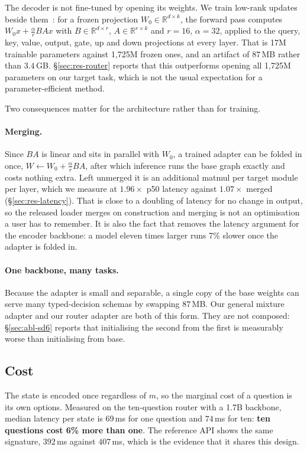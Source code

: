 The decoder is not fine-tuned by opening its weights. We train low-rank
updates beside them~\cite{lora}: for a frozen projection $W_0 \in
\mathbb{R}^{d\times k}$, the forward pass computes $W_0 x + \tfrac{\alpha}{r}
BAx$ with $B \in \mathbb{R}^{d\times r}$, $A \in \mathbb{R}^{r\times k}$
and $r = 16$, $\alpha = 32$, applied to the query, key, value, output,
gate, up and down projections at every layer. That is 17M trainable
parameters against 1{,}725M frozen ones, and an artifact of $87$\,MB
rather than $3.4$\,GB. \S\ref{sec:res-router} reports that this
outperforms opening all 1{,}725M parameters on our target task, which is
not the usual expectation for a parameter-efficient method.

Two consequences matter for the architecture rather than for training.

\paragraph{Merging.} Since $BA$ is linear and sits in parallel with
$W_0$, a trained adapter can be folded in once, $W \gets W_0 +
\tfrac{\alpha}{r} BA$, after which inference runs the base graph exactly
and costs nothing extra. Left unmerged it is an additional matmul per
target module per layer, which we measure at $1.96\times$ p50 latency
against $1.07\times$ merged (\S\ref{sec:res-latency}). That is close to a
doubling of latency for no change in output, so the released loader
merges on construction and merging is not an optimisation a user has to
remember. It is also the fact that removes the latency argument for the
encoder backbone: a model eleven times larger runs 7\% slower once the
adapter is folded in.

\paragraph{One backbone, many tasks.} Because the adapter is small and
separable, a single copy of the base weights can serve many typed-decision
schemas by swapping $87$\,MB. Our general mixture adapter and our router
adapter are both of this form. They are not composed: \S\ref{sec:abl-sd6}
reports that initialising the second from the first is measurably worse
than initialising from base.

\subsection{Cost}

The state is encoded once regardless of $m$, so the marginal cost of a
question is its own options. Measured on the ten-question router with a
1.7B backbone, median latency per state is $69$\,ms for one question and
$74$\,ms for ten: \textbf{ten questions cost 6\% more than one}. The
reference API shows the same signature, $392$\,ms against $407$\,ms, which
is the evidence that it shares this design.

